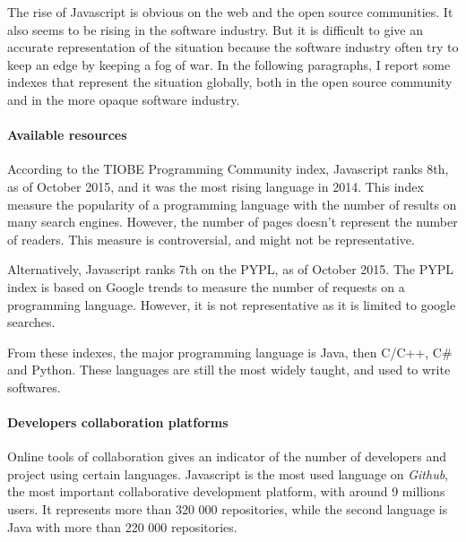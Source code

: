 The rise of Javascript is obvious on the web and the open source communities.
It also seems to be rising in the software industry.
But it is difficult to give an accurate representation of the situation because the software industry often try to keep an edge by keeping a fog of war.
In the following paragraphs, I report some indexes that represent the situation globally, both in the open source community and in the more opaque software industry.

\paragraph{Available resources}

According to the TIOBE Programming Community index, Javascript ranks 8th, as of October 2015, and it was the most rising language in 2014.
This index measure the popularity of a programming language with the number of results on many search engines.
However, the number of pages doesn't represent the number of readers.
This measure is controversial, and might not be representative.

Alternatively, Javascript ranks 7th on the PYPL, as of October 2015.
The PYPL index is based on Google trends to measure the number of requests on a programming language.
However, it is not representative as it is limited to google searches.

From these indexes, the major programming language is Java, then C/C++, C\# and Python.
These languages are still the most widely taught, and used to write softwares.


\paragraph{Developers collaboration platforms}

Online tools of collaboration gives an indicator of the number of developers and project using certain languages.
Javascript is the most used language on \textit{Github}, the most important collaborative development platform, with around 9 millions users.
It represents more than 320 000 repositories, while the second language is Java with more than 220 000 repositories.

